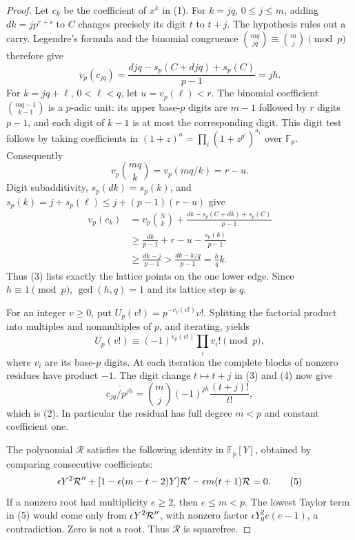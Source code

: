 \documentclass[11pt]{article}
\begin{document}
\begin{proof}
Let $c_k$ be the coefficient of $x^k$ in (1).
For $k=jq$, $0\le j\le m$, adding $dk=jp^{r+s}$ to $C$
changes precisely its digit $t$ to $t+j$. The hypothesis rules out
a carry. Legendre's formula and the binomial congruence
$\binom{mq}{jq}\equiv\binom mj\pmod p$ therefore give
\[
 v_p(c_{jq})=
 \frac{djq-s_p(C+djq)+s_p(C)}{p-1}=jh.                       \tag{3}
\]
For $k=jq+\ell$, $0<\ell<q$, let $u=v_p(\ell)<r$.
The binomial coefficient $\binom{mq-1}{k-1}$ is a $p$-adic unit:
its upper base-$p$ digits are $m-1$ followed by $r$ digits $p-1$,
and each digit of $k-1$ is at most the corresponding digit.
This digit test follows by taking coefficients in
$(1+z)^a=\prod_i(1+z^{p^i})^{a_i}$ over $\mathbb F_p$.
Consequently
\[
 v_p\binom{mq}{k}=v_p(mq/k)=r-u.
\]
Digit subadditivity, $s_p(dk)=s_p(k)$, and
$s_p(k)=j+s_p(\ell)\le j+(p-1)(r-u)$ give
\begin{align*}
 v_p(c_k)
 &=v_p\binom Nk+
       \frac{dk-s_p(C+dk)+s_p(C)}{p-1}\\
 &\ge \frac{dk}{p-1}+r-u-\frac{s_p(k)}{p-1}\\
 &\ge \frac{dk-j}{p-1}
 >\frac{dk-k/q}{p-1}=\frac{h}{q}k.
\end{align*}
Thus (3) lists exactly the lattice points on the one lower edge.
Since $h\equiv1\pmod p$, $\gcd(h,q)=1$ and its lattice step is $q$.

For an integer $v\ge0$, put
$U_p(v!)=p^{-v_p(v!)}v!$. Splitting the factorial product into
multiples and nonmultiples of $p$, and iterating, yields
\[
 U_p(v!)\equiv(-1)^{v_p(v!)}\prod_i v_i!\pmod p,               \tag{4}
\]
where $v_i$ are its base-$p$ digits. At each iteration the complete
blocks of nonzero residues have product $-1$.
The digit change $t\mapsto t+j$ in (3) and (4) now give
\[
 \overline{c_{jq}/p^{jh}}
   =\binom mj(-1)^{jh}\frac{(t+j)!}{t!},
\]
which is (2). In particular the residual has full degree $m<p$
and constant coefficient one.

The polynomial $\mathcal R$ satisfies the following identity in
$\mathbb F_p[Y]$, obtained by comparing consecutive coefficients:
\[
 \epsilon Y^2{\cal R}''
 +[1-\epsilon(m-t-2)Y]{\cal R}'
 -\epsilon m(t+1){\cal R}=0.                                \tag{5}
\]
If a nonzero root had multiplicity $e\ge2$, then $e\le m<p$.
The lowest Taylor term in (5) would come only from
$\epsilon Y^2{\cal R}''$, with nonzero factor
$\epsilon Y_0^2e(e-1)$, a contradiction. Zero is not a root.
Thus $\mathcal R$ is squarefree.


\end{proof}
\end{document}
